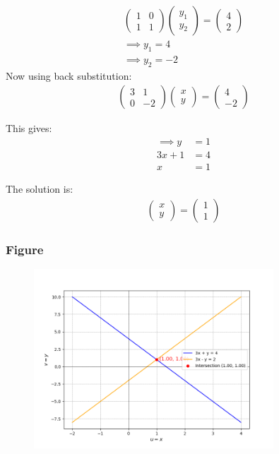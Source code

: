 \documentclass{beamer}
\theoremstyle{remark}
\newcommand{\myvec}[1]{\ensuremath{\begin{pmatrix}#1\end{pmatrix}}}
\numberwithin{equation}{section}
\begin{document}
\begin{frame}

\begin{align}
    \myvec{1 & 0\\ 1 & 1}\myvec{y_1\\y_2} = \myvec{4\\2}\\
    \implies y_1 =4\\
    \implies y_2 =-2
\end{align}
Now using back substitution:
\begin{align}
    \myvec{3 & 1\\0 & -2}\myvec{x\\y} = \myvec{4\\ -2}
\end{align}

This gives:
\begin{align}
      \implies y&=1\\
    3x + 1 &= 4\\
    x &= 1
\end{align}

The solution is:
\begin{align}
    \myvec{x\\y} = \myvec{1 \\ 1}
 \end{align}
\end{frame}
\begin{frame}
\frametitle{Figure}
\begin{figure}[h!]
   \centering
	 \includegraphics[width=0.8\textwidth]{fig.pdf}
\end{figure}

\end{frame}
\end{document}

